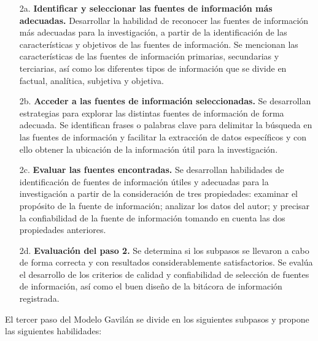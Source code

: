 \begin{itemize}
  \item [2a.] \textbf{Identificar y seleccionar las fuentes de información más adecuadas.} Desarrollar la habilidad de reconocer las fuentes de información más adecuadas para la investigación, a partir de la identificación de las características y objetivos de las fuentes de información. Se mencionan las características de las fuentes de información primarias, secundarias y terciarias, así como los diferentes tipos de información que se divide en factual, analítica, subjetiva y objetiva.
  \item [2b.] \textbf{Acceder a las fuentes de información seleccionadas.} Se desarrollan estrategias para explorar las distintas fuentes de información de forma adecuada. Se identifican frases o palabras clave para delimitar la búsqueda en las fuentes de información y facilitar la extracción de datos específicos y con ello obtener la ubicación de la información útil para la investigación.
  \item [2c.] \textbf{Evaluar las fuentes encontradas.} Se desarrollan habilidades de identificación de fuentes de información útiles y adecuadas para la investigación a partir de la consideración de tres propiedades: examinar el propósito de la fuente de información; analizar los datos del autor; y precisar la confiabilidad de la fuente de información tomando en cuenta las dos propiedades anteriores.
  \item [2d.] \textbf{Evaluación del paso 2.} Se determina si los subpasos se llevaron a cabo de forma correcta y con resultados considerablemente satisfactorios. Se evalúa el desarrollo de los criterios de calidad y confiabilidad de selección de fuentes de información, así como el buen diseño de la bitácora de información registrada.
\end{itemize}

El tercer paso del Modelo Gavilán se divide en los siguientes subpasos y propone las siguientes habilidades:

